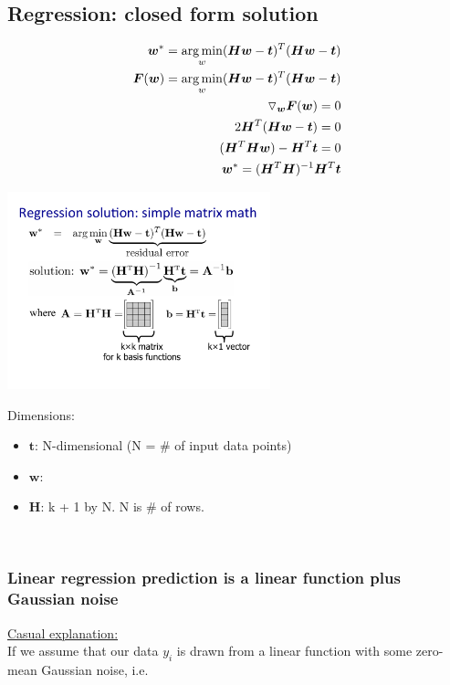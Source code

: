 \subsection{Regression: closed form solution}
\begin{align*}
	\bm{w}^* = \operatorname*{arg\,min}_w (\bm{Hw} -\bm{t})^T (\bm{Hw} -\bm{t})  & \\
	\bm{F}(\bm{w}) =  \operatorname*{arg\,min}_w (\bm{Hw} -\bm{t})^T (\bm{Hw} -\bm{t}) & \\
	\triangledown_{\bm{w}}\bm{F}(\bm{w}) = 0 \\
	2 \bm{H}^T (\bm{H}\bm{w}-\bm{t}) = 0  & \\
	(\bm{H}^T\bm{H}\bm{w}) - \bm{H}^T\bm{t} = 0 & \\
	\bm{w}^* = (\bm{H}^T\bm{H})^{-1}\bm{H}^T\bm{t} &
\end{align*}

\includegraphics[width=3in]{figures/Regression_matrix_math.pdf}

Dimensions: 
\begin{itemize}
	\item $\bm{t}$:  N-dimensional  (N = \# of input data points) 
	\item $\bm{w}$: 
	\item $\bm{H}$: k + 1 by N.  N is \# of rows. 
\end{itemize}
\hfill \\

\subsubsection{Linear regression prediction is a linear function plus Gaussian noise}
\underline{Casual explanation:} \hfill \\
If we assume that our data $y_i$ is drawn from a linear function with some zero-mean Gaussian noise, i.e.

